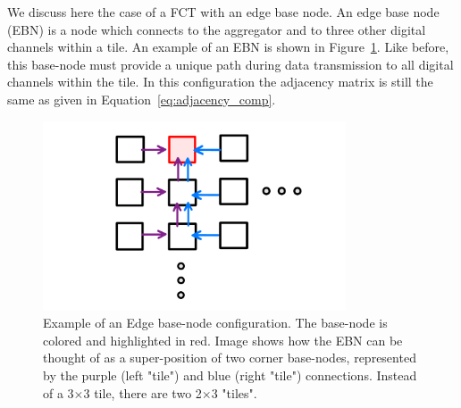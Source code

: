 We discuss here the case of a FCT with an edge base node.
An edge base node (EBN) is a node which connects to the aggregator and to three other digital channels within a tile.
An example of an EBN is shown in Figure~\ref{fig:ebn}.
Like before, this base-node must provide a unique path during data transmission to all digital channels within the tile.
In this configuration the adjacency matrix is still the same as given in Equation~\ref{eq:adjacency_comp}.

\begin{figure}[]
\centering
\includegraphics[width=0.8\textwidth]{images/EBN_superposition.pdf}
\caption{Example of an Edge base-node configuration.
The base-node is colored and highlighted in red.
Image shows how the EBN can be thought of as a super-position of two corner base-nodes, represented by the purple (left "tile") and blue (right "tile") connections.
Instead of a 3$\times$3 tile, there are two 2$\times$3 "tiles".
}
\label{fig:ebn}
\end{figure}
